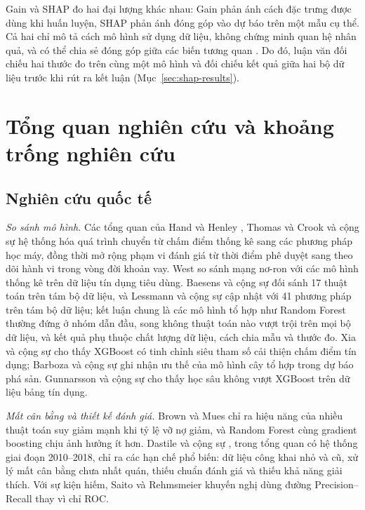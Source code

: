 Gain và SHAP đo hai đại lượng khác nhau: Gain phản ánh cách đặc trưng được dùng khi huấn luyện, SHAP phản ánh đóng góp vào dự báo trên một mẫu cụ thể. Cả hai chỉ mô tả cách mô hình sử dụng dữ liệu, không chứng minh quan hệ nhân quả, và có thể chia sẻ đóng góp giữa các biến tương quan \cite{lundberg2017unified}. Do đó, luận văn đối chiếu hai thước đo trên cùng một mô hình và đối chiếu kết quả giữa hai bộ dữ liệu trước khi rút ra kết luận (Mục~\ref{sec:shap-results}).

\section{Tổng quan nghiên cứu và khoảng trống nghiên cứu}

\subsection{Nghiên cứu quốc tế}

\noindent\textit{So sánh mô hình.} Các tổng quan của Hand và Henley \cite{hand1997statistical}, Thomas \cite{thomas2000survey} và Crook và cộng sự \cite{crook2007recent} hệ thống hóa quá trình chuyển từ chấm điểm thống kê sang các phương pháp học máy, đồng thời mở rộng phạm vi đánh giá từ thời điểm phê duyệt sang theo dõi hành vi trong vòng đời khoản vay. West \cite{west2000neural} so sánh mạng nơ-ron với các mô hình thống kê trên dữ liệu tín dụng tiêu dùng. Baesens và cộng sự \cite{baesens2003benchmarking} đối sánh 17 thuật toán trên tám bộ dữ liệu, và Lessmann và cộng sự \cite{lessmann2015benchmarking} cập nhật với 41 phương pháp trên tám bộ dữ liệu; kết luận chung là các mô hình tổ hợp như Random Forest thường đứng ở nhóm dẫn đầu, song không thuật toán nào vượt trội trên mọi bộ dữ liệu, và kết quả phụ thuộc chất lượng dữ liệu, cách chia mẫu và thước đo. Xia và cộng sự \cite{xia2017boosted} cho thấy XGBoost có tinh chỉnh siêu tham số cải thiện chấm điểm tín dụng; Barboza và cộng sự \cite{barboza2017machine} ghi nhận ưu thế của mô hình cây tổ hợp trong dự báo phá sản. Gunnarsson và cộng sự \cite{gunnarsson2021deep} cho thấy học sâu không vượt XGBoost trên dữ liệu bảng tín dụng.

\noindent\textit{Mất cân bằng và thiết kế đánh giá.} Brown và Mues \cite{brown2012experimental} chỉ ra hiệu năng của nhiều thuật toán suy giảm mạnh khi tỷ lệ vỡ nợ giảm, và Random Forest cùng gradient boosting chịu ảnh hưởng ít hơn. Dastile và cộng sự \cite{dastile2020statistical}, trong tổng quan có hệ thống giai đoạn 2010--2018, chỉ ra các hạn chế phổ biến: dữ liệu công khai nhỏ và cũ, xử lý mất cân bằng chưa nhất quán, thiếu chuẩn đánh giá và thiếu khả năng giải thích. Với sự kiện hiếm, Saito và Rehmsmeier \cite{saito2015precision} khuyến nghị dùng đường Precision--Recall thay vì chỉ ROC.

